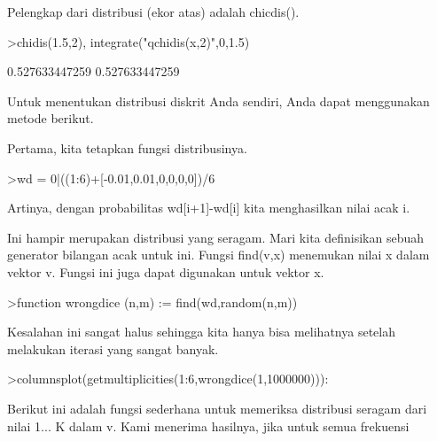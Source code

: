 \documentclass[a4paper,10pt]{article}
\begin{document}
\begin{eulernotebook}
\begin{eulercomment}
\begin{eulercomment}
\begin{eulercomment}
\begin{eulercomment}
\begin{eulercomment}
\begin{eulercomment}
\begin{eulercomment}
\begin{eulercomment}
\begin{eulercomment}
\begin{eulercomment}
\begin{eulercomment}
\begin{eulercomment}
\begin{eulercomment}
\begin{eulercomment}
\begin{eulercomment}
\begin{eulercomment}
\begin{eulercomment}
\begin{eulercomment}
\begin{eulercomment}
Pelengkap dari distribusi (ekor atas) adalah chicdis().
\end{eulercomment}
\begin{eulerprompt}
>chidis(1.5,2), integrate("qchidis(x,2)",0,1.5)
\end{eulerprompt}
\begin{euleroutput}
  0.527633447259
  0.527633447259
\end{euleroutput}
\begin{eulercomment}
Untuk menentukan distribusi diskrit Anda sendiri, Anda dapat
menggunakan metode berikut.

Pertama, kita tetapkan fungsi distribusinya.
\end{eulercomment}
\begin{eulerprompt}
>wd = 0|((1:6)+[-0.01,0.01,0,0,0,0])/6
\end{eulerprompt}
\begin{euleroutput}
  [0,  0.165,  0.335,  0.5,  0.666667,  0.833333,  1]
\end{euleroutput}
\begin{eulercomment}
Artinya, dengan probabilitas wd[i+1]-wd[i] kita menghasilkan nilai
acak i.

Ini hampir merupakan distribusi yang seragam. Mari kita definisikan
sebuah generator bilangan acak untuk ini. Fungsi find(v,x) menemukan
nilai x dalam vektor v. Fungsi ini juga dapat digunakan untuk vektor
x.
\end{eulercomment}
\begin{eulerprompt}
>function wrongdice (n,m) := find(wd,random(n,m))
\end{eulerprompt}
\begin{eulercomment}
Kesalahan ini sangat halus sehingga kita hanya bisa melihatnya setelah
melakukan iterasi yang sangat banyak.
\end{eulercomment}
\begin{eulerprompt}
>columnsplot(getmultiplicities(1:6,wrongdice(1,1000000))):
\end{eulerprompt}
\begin{eulercomment}
Berikut ini adalah fungsi sederhana untuk memeriksa distribusi seragam
dari nilai 1... K dalam v. Kami menerima hasilnya, jika untuk semua
frekuensi


\end{eulercomment}
\end{eulercomment}
\end{eulercomment}
\end{eulercomment}
\end{eulercomment}
\end{eulercomment}
\end{eulercomment}
\end{eulercomment}
\end{eulercomment}
\end{eulercomment}
\end{eulercomment}
\end{eulercomment}
\end{eulercomment}
\end{eulercomment}
\end{eulercomment}
\end{eulercomment}
\end{eulercomment}
\end{eulercomment}
\end{eulercomment}
\end{eulernotebook}
\end{document}
